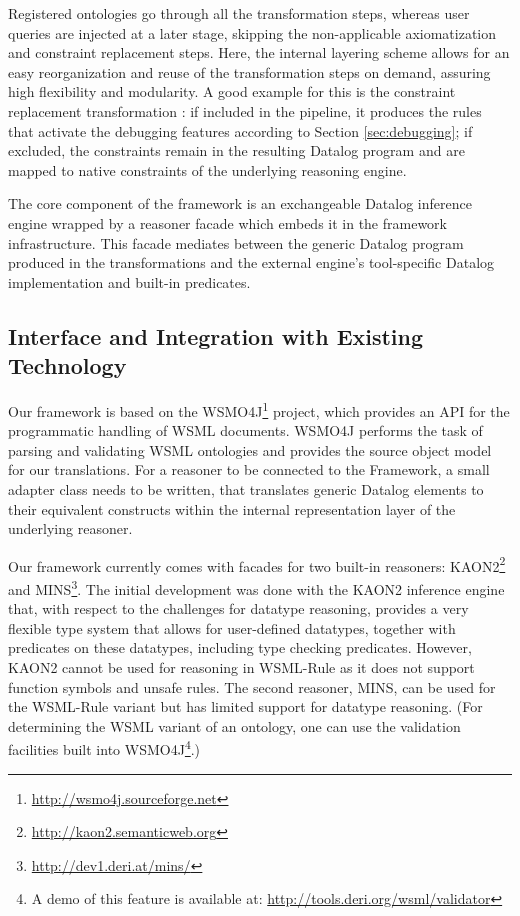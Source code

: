 Registered ontologies go through all the transformation steps,
whereas user queries are injected at a later stage, skipping the
non-applicable axiomatization and constraint replacement steps.
Here, the internal layering scheme allows for an easy
reorganization and reuse of the transformation steps on demand,
assuring high flexibility and modularity. A good example for this
is the constraint replacement transformation \transdebug: if
included in the pipeline, it produces the rules that activate the
debugging features according to Section \ref{sec:debugging}; if
excluded, the constraints remain in the resulting Datalog program
and are mapped to native constraints of the underlying reasoning
engine.

The core component of the framework is an exchangeable Datalog
inference engine wrapped by a reasoner facade which embeds it in
the framework infrastructure. This facade mediates between the
generic Datalog program produced in the transformations and the
external engine's tool-specific Datalog implementation and
built-in predicates.

\subsection{Interface and Integration with Existing Technology}
Our framework is based on the
WSMO4J\footnote{\url{http://wsmo4j.sourceforge.net}} project,
which provides an API for the programmatic handling of WSML
documents. WSMO4J performs the task of parsing and validating WSML
ontologies and provides the source object model for our
translations. For a reasoner to be connected to the Framework, a
small adapter class needs to be written, that translates generic
Datalog elements to their equivalent constructs within the
internal representation layer of the underlying reasoner.

Our framework currently comes with facades for two built-in
reasoners: KAON2\footnote{\url{http://kaon2.semanticweb.org}} and
MINS\footnote{\url{http://dev1.deri.at/mins/}}. The initial
development was done with the KAON2 inference engine that, with
respect to the challenges for datatype reasoning, provides a very
flexible type system that allows for user-defined datatypes,
together with predicates on these datatypes, including type
checking predicates. However, KAON2 cannot be used for reasoning
in WSML-Rule as it does not support function symbols and unsafe
rules. The second reasoner, MINS, can be used for the WSML-Rule
variant but has limited support for datatype reasoning. (For
determining the WSML variant of an ontology, one can use the
validation facilities built into WSMO4J\footnote{A demo of this
feature is available at:
\url{http://tools.deri.org/wsml/validator}}.)
